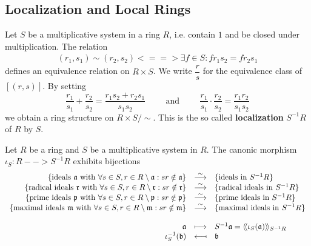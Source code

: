 	\subsection{Localization and Local Rings}

	\begin{definition}
		Let $S$ be a multiplicative system in a ring $R$, i.e. contain $1$ and be closed under multiplication. The relation
		\begin{align*}
			(r_1,s_1) \sim (r_2,s_2) <==> \exists f\in S: fr_1s_2 = fr_2s_1
		\end{align*}
		defines an equivalence relation on $R \times S$. We write $\dfrac{r}{s}$ for the equivalence class of $[(r,s)]$. By setting
		\begin{equation*}
			\dfrac{r_1}{s_1} + \dfrac{r_2}{s_2} = \dfrac{r_1s_2 + r_2s_1}{s_1s_2} \hspace{1cm}\text{and}\hspace{1cm} \dfrac{r_1}{s_1} \cdot \dfrac{r_2}{s_2} = \dfrac{r_1r_2}{s_1s_2}
		\end{equation*}
		we obtain a ring structure on $R \times S / \sim$. This is the so called \textbf{localization} $S^{-1}R$ of $R$ by $S$.
	\end{definition}


	\begin{theorem}
		Let $R$ be a ring and $S$ be a multiplicative system in $R$. The canonic morphism $\iota_S: R --> S^{-1}R$ exhibits bijections
		\begin{equation*}
			\begin{array}{rcl}
				\{\text{ideals }\ideal{a}\text{ with } \forall s \in S, r \in R \setminus \ideal{a}: sr \notin \ideal{a}\} &\overset{\sim}{\longrightarrow} &\{\text{ideals in } S^{-1}R\}\\
				\{\text{radical ideals }\ideal{r}\text{ with } \forall s \in S, r \in R \setminus \ideal{r}: sr \notin \ideal{r}\} &\overset{\sim}{\longrightarrow} &\{\text{radical ideals in } S^{-1}R\}\\
				\{\text{prime ideals }\ideal{p}\text{ with } \forall s \in S, r \in R \setminus \ideal{p}: sr \notin \ideal{p}\} &\overset{\sim}{\longrightarrow} &\{\text{prime ideals in } S^{-1}R\}\\
				\{\text{maximal ideals }\ideal{m}\text{ with } \forall s \in S, r \in R \setminus \ideal{m}: sr \notin \ideal{m}\} &\overset{\sim}{\longrightarrow} &\{\text{maximal ideals in } S^{-1}R\}\\\\
				\ideal{a} &\longmapsto &S^{-1}\ideal{a} = \Gen{\iota_S(\ideal{a})}_{S^{-1}R}\\
				\iota_S^{-1}(\ideal{b}) &\reflectbox{$\longmapsto$} &\ideal{b}
			\end{array}
		\end{equation*}
	\end{theorem}

